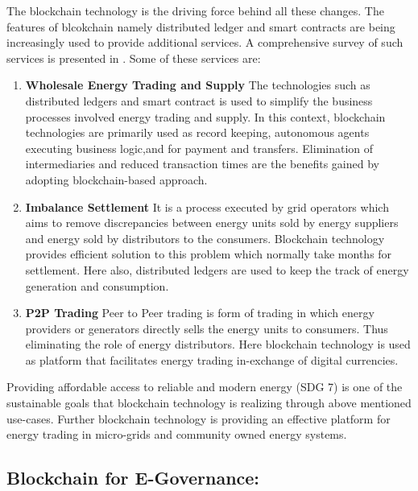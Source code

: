 \documentclass[10pt]{IETBook}
\begin{document}
The blockchain technology is the driving force behind all these changes. The features of blcokchain namely distributed ledger and smart contracts are being increasingly used to provide additional services. A comprehensive survey of such services is presented in \cite{andoni2019blockchain}. Some of these services are:

\begin{enumerate}
    \item {\bf Wholesale Energy Trading and Supply} The technologies such as distributed ledgers and smart contract is used to simplify the business processes involved energy trading and supply. In this context, blockchain technologies are primarily used as record keeping, autonomous agents executing business logic,and for payment and transfers. Elimination of intermediaries and reduced transaction times are the benefits gained by adopting blockchain-based approach.
    \item {\bf Imbalance Settlement} It is a process executed by grid operators which aims to remove discrepancies between energy units sold by energy suppliers and energy sold by distributors to the consumers. Blockchain technology provides efficient solution to this problem which normally take months for settlement. Here also, distributed ledgers are used to keep the track of energy generation and consumption.
    \item{\bf P2P Trading} Peer to Peer trading is form of trading in which energy providers or generators directly sells the energy units to consumers. Thus eliminating the role of energy distributors. Here blockchain technology is used as platform that facilitates energy trading in-exchange of digital currencies. 
\end{enumerate}

Providing affordable access to reliable and modern energy (SDG 7) is one of the sustainable goals that blockchain technology is realizing through above mentioned use-cases. Further blockchain technology is providing an effective platform for energy trading in micro-grids and community owned energy systems.

\subsection{Blockchain for E-Governance:}
\end{document}
